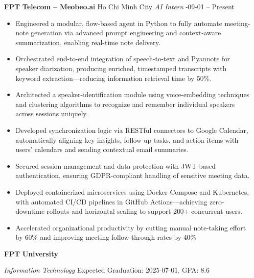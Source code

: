 \documentclass[letterpaper, 11pt]{article}
\newcommand{\sectiontitle}[1]{\vspace{0.1in}\noindent{\Large\color{primary} #1}\vspace{0.05in}\hrulefill}
\newcommand{\entry}[4]{
    \vspace{0.02in}
    \noindent\textbf{#1}
    \hfill
    #2
    \newline
    \textit{#3}
    \newline
    #4
}
\begin{document}
\sectiontitle{Experience}
\entry{FPT Telecom – Meobeo.ai}{Ho Chi Minh City}{AI Intern}{2024-09-01 – Present}
\begin{itemize}[leftmargin=0.2in]
    \item Engineered a modular, flow-based agent in Python to fully automate meeting-note generation via advanced prompt engineering and context-aware summarization, enabling real-time note delivery.
    \item Orchestrated end-to-end integration of speech-to-text and Pyannote for speaker diarization, producing enriched, timestamped transcripts with keyword extraction—reducing information retrieval time by 50\%.
    \item Architected a speaker-identification module using voice-embedding techniques and clustering algorithms to recognize and remember individual speakers across sessions uniquely.
    \item Developed synchronization logic via RESTful connectors to Google Calendar, automatically aligning key insights, follow-up tasks, and action items with users’ calendars and sending contextual email summaries.
    \item Secured session management and data protection with JWT-based authentication, ensuring GDPR-compliant handling of sensitive meeting data.
    \item Deployed containerized microservices using Docker Compose and Kubernetes, with automated CI/CD pipelines in GitHub Actions—achieving zero-downtime rollouts and horizontal scaling to support 200+ concurrent users.
    \item Accelerated organizational productivity by cutting manual note-taking effort by 60\% and improving meeting follow-through rates by 40\%
\end{itemize}

\sectiontitle{Education}
\entry{FPT University}{}{Information Technology}{Expected Graduation: 2025-07-01, GPA: 8.6}
\end{document}
